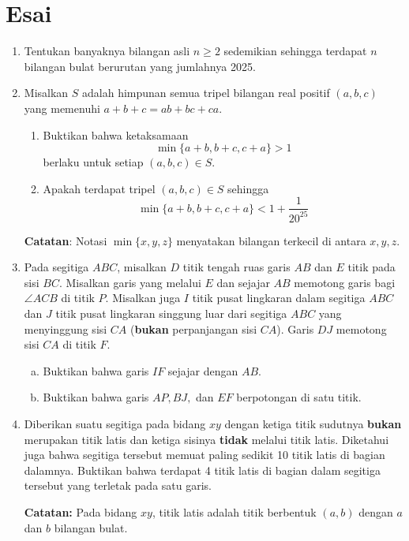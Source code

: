 \documentclass[12pt]{scrartcl}
\begin{document}
\section{Esai}
\begin{enumerate}
    \item Tentukan banyaknya bilangan asli $n \ge 2$ sedemikian sehingga terdapat $n$ bilangan bulat berurutan yang jumlahnya 2025.

    \item Misalkan $S$ adalah himpunan semua tripel bilangan real positif $(a,b,c)$ yang memenuhi $a+b+c = ab+bc+ca$.
    \begin{enumerate}
        \item Buktikan bahwa ketaksamaan
        \[ \min\{a+b,b+c,c+a\} > 1 \]
        berlaku untuk setiap $(a,b,c) \in S$.
        \item Apakah terdapat tripel $(a,b,c) \in S$ sehingga
        \[ \min\{a+b,b+c,c+a\} < 1+\dfrac{1}{20^{25}} \]
    \end{enumerate}
    \textbf{Catatan}: Notasi $\min\{x,y,z\}$ menyatakan bilangan terkecil di antara $x,y,z$.

    \item Pada segitiga $ABC$, misalkan $D$ titik tengah ruas garis $AB$ dan $E$ titik pada sisi $BC$. Misalkan garis yang melalui $E$ dan sejajar $AB$ memotong garis bagi $\angle ACB$ di titik $P$. Misalkan juga $I$ titik pusat lingkaran dalam segitiga $ABC$ dan $J$ titik pusat lingkaran singgung luar dari segitiga $ABC$ yang menyinggung sisi $CA$ (\textbf{bukan} perpanjangan sisi $CA$). Garis $DJ$ memotong sisi $CA$ di titik $F$.

    \begin{enumerate}[(a)]
        \item Buktikan bahwa garis $IF$ sejajar dengan $AB$.
        \item Buktikan bahwa garis $AP, BJ,$ dan $EF$ berpotongan di satu titik.
    \end{enumerate}
    
    \item Diberikan suatu segitiga pada bidang $xy$ dengan ketiga titik sudutnya \textbf{bukan} merupakan titik latis dan ketiga sisinya \textbf{tidak} melalui titik latis. Diketahui juga bahwa segitiga tersebut memuat paling sedikit 10 titik latis di bagian dalamnya. Buktikan bahwa terdapat 4 titik latis di bagian dalam segitiga tersebut yang terletak pada satu garis.
    
    \textbf{Catatan:} Pada bidang $xy$, titik latis adalah titik berbentuk $(a, b)$ dengan $a$ dan $b$ bilangan bulat.
\end{enumerate}
\end{document}
